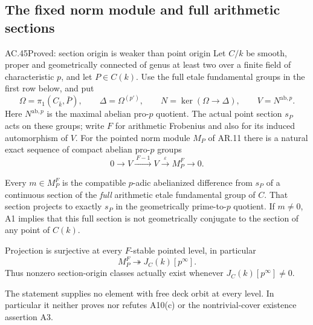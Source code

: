 \subsection{The fixed norm module and full arithmetic sections}

\begin{claim}{AC.45}{Proved: section origin is weaker than point origin}
\label{clm:ACnormsectionorigin}
Let $C/k$ be smooth, proper and geometrically connected of genus
at least two over a finite field of characteristic $p$, and let
$P\in C(k)$. Use the full etale fundamental groups in the
first row below, and put
\[
 \Omega=\pi_1(C_{\bar k},\bar P),\qquad
 \Delta=\Omega^{(p')},\qquad
 N=\ker(\Omega\longrightarrow\Delta),\qquad
 V=N^{\mathrm{ab},p}.
                                                        \tag{AC.45.1}
\]
Here $N^{\mathrm{ab},p}$ is the maximal abelian pro-$p$
quotient. The actual point section $s_P$ acts on these
groups; write $F$ for arithmetic Frobenius and also for
its induced automorphism of $V$. For the pointed norm
module $M_P$ of AR.11 there is a natural exact sequence
of compact abelian pro-$p$ groups
\[
 0\longrightarrow V\xrightarrow{\ F-1\ }V
      \xrightarrow{\ \varepsilon\ }M_P^F
      \longrightarrow0.
                                                        \tag{AC.45.2}
\]

Every $m\in M_P^F$ is the compatible $p$-adic
abelianized difference from $s_P$ of a continuous section
of the \emph{full} arithmetic etale fundamental group
of $C$. That section projects to exactly $s_P$ in the
geometrically prime-to-$p$ quotient. If $m\ne0$, A1
implies that this full section is not geometrically
conjugate to the section of any point of $C(k)$.

Projection is surjective at every $F$-stable pointed
level, in particular
\[
                    M_P^F\twoheadrightarrow J_C(k)[p^\infty].
                                                        \tag{AC.45.8}
\]
Thus nonzero section-origin classes actually exist
whenever $J_C(k)[p^\infty]\ne0$.

The statement supplies no element with free deck orbit
at every level. In particular it neither proves nor
refutes A10(c) or the nontrivial-cover existence
assertion A3.
\end{claim}

